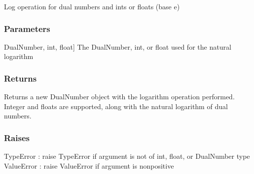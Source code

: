 \documentclass[letterpaper,10pt,english]{sphinxmanual}
\begin{document}
\begin{fulllineitems}
\label{\detokenize{autodiff:autodiff.log}}
\pysigstartsignatures
{}
\pysigstopsignatures
\sphinxAtStartPar
Log operation for dual numbers and ints or floats (base e)


\subsubsection{Parameters}
\label{\detokenize{autodiff:id57}}\begin{description}
\sphinxlineitem{x}{[}DualNumber, int, float{]}
\sphinxAtStartPar
The DualNumber, int, or float used for the natural logarithm

\end{description}


\subsubsection{Returns}
\label{\detokenize{autodiff:id58}}\begin{description}
\sphinxAtStartPar
Returns a new DualNumber object with the logarithm operation performed. Integer and
floats are supported, along with the natural logarithm of dual numbers.

\end{description}


\subsubsection{Raises}
\label{\detokenize{autodiff:id59}}
\sphinxAtStartPar
TypeError : raise TypeError if argument is not of int, float, or DualNumber type
ValueError : raise ValueError if argument is nonpositive

\end{fulllineitems}

\end{document}
